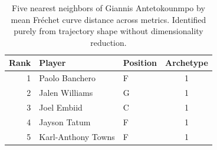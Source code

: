 \begin{table}[htbp]
  \centering\small
  \begin{tabular}{rllc}
    \toprule
    Rank & Player & Position & Archetype \\
    \midrule
    1 & Paolo Banchero & F & 1 \\
    2 & Jalen Williams & G & 1 \\
    3 & Joel Embiid & C & 1 \\
    4 & Jayson Tatum & F & 1 \\
    5 & Karl-Anthony Towns & F & 1 \\
    \bottomrule
  \end{tabular}
  \caption{Five nearest neighbors of Giannis Antetokounmpo by mean Fr\'{e}chet curve distance across metrics. Identified purely from trajectory shape without dimensionality reduction.}
  \label{tab:Giannis_Antetokounmpo_frechet_curve_neighbors}
\end{table}

